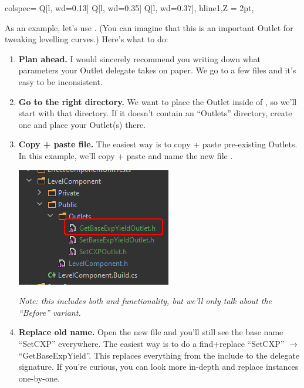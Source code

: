 \begin{longtblr}[
	caption = {Delegate Arrays for \code{LevelComponent}},
	label = {delegate-arrays-levelcomponent},
]{
	colspec= {Q[l, wd=0.13\linewidth] Q[l, wd=0.35\linewidth] Q[l, wd=0.37\linewidth]},
	hline{1,Z} = {2pt},
}

	
\end{longtblr}



As an example, let's use . (You can imagine that this is an important Outlet for tweaking levelling curves.) Here's what to do:\\

\begin{enumerate}
	\item{\textbf{Plan ahead.} I would sincerely recommend you writing down what parameters your Outlet delegate takes on paper. We go to a few files and it's easy to be inconsistent.}
	\item{\textbf{Go to the right directory.} We want to place the Outlet inside of , so we'll start with that directory. If it doesn't contain an ``Outlets'' directory, create one and place your Outlet(s) there.}
	\item{\textbf{Copy + paste file.} The easiest way is to copy + paste pre-existing Outlets. In this example, we'll copy + paste  and name the new file . \\
	\begin{center}
		\includegraphics[scale=\ScreenshotScale]{create-outlet-rename}
	\end{center}
	\noindent \textit{Note: this includes both  and  functionality, but we'll only talk about the ``Before'' variant.}
	}
	\item{\textbf{Replace old name.} Open the new file and you'll still see the base name ``SetCXP'' everywhere. The easiest way is to do a find+replace ``SetCXP'' $\rightarrow$ ``GetBaseExpYield''. This replaces everything from the  include to the delegate signature. If you're curious, you can look more in-depth and replace instances one-by-one.}

\end{enumerate}
